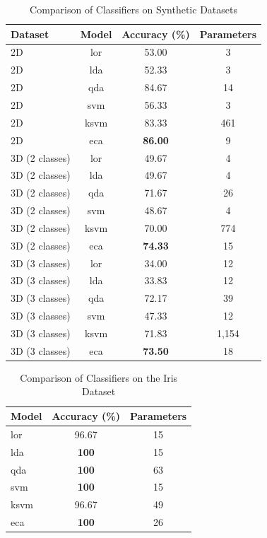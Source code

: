 \documentclass[lettersize,journal]{IEEEtran}
\begin{document}
\begin{table}[ht]
    \caption{Comparison of Classifiers on Synthetic Datasets}
    \centering
    \begin{tabular}{@{}lccc@{}}
        \toprule
        \textbf{Dataset} & \textbf{Model} & \textbf{Accuracy (\%)} & \textbf{Parameters} \\ \midrule
        2D & \Gls{lor} & 53.00 & 3 \\
        2D & \Gls{lda} & 52.33 & 3 \\
        2D & \Gls{qda} & 84.67 & 14 \\
        2D & \Gls{svm} & 56.33 & 3 \\
        2D & \Gls{ksvm} & 83.33 & 461 \\
        2D & \Gls{eca} & \textbf{86.00} & 9 \\ \midrule
        3D (2 classes) & \Gls{lor} & 49.67 & 4 \\
        3D (2 classes) & \Gls{lda} & 49.67 & 4 \\
        3D (2 classes) & \Gls{qda} & 71.67 & 26 \\
        3D (2 classes) & \Gls{svm} & 48.67 & 4 \\
        3D (2 classes) & \Gls{ksvm} & 70.00 & 774 \\
        3D (2 classes) & \Gls{eca} & \textbf{74.33} & 15 \\ \midrule
        3D (3 classes) & \Gls{lor} & 34.00 & 12 \\
        3D (3 classes) & \Gls{lda} & 33.83 & 12 \\
        3D (3 classes) & \Gls{qda} & 72.17 & 39 \\
        3D (3 classes) & \Gls{svm} & 47.33 & 12 \\
        3D (3 classes) & \Gls{ksvm} & 71.83 & 1,154 \\
        3D (3 classes) & \Gls{eca} & \textbf{73.50} & 18 \\ \bottomrule
    \end{tabular}
    \label{tab:synthetic}
\end{table}

\begin{table}[ht]
    \caption{Comparison of Classifiers on the Iris Dataset}
    \centering
    \begin{tabular}{@{}lcc@{}}
        \toprule
        \textbf{Model} & \textbf{Accuracy (\%)} & \textbf{Parameters} \\ \midrule
        \Gls{lor} & 96.67 & 15 \\
        \Gls{lda} & \textbf{100} & 15 \\
        \Gls{qda} & \textbf{100} & 63 \\
        \Gls{svm} & \textbf{100} & 15 \\
        \Gls{ksvm} & 96.67 & 49 \\
        \Gls{eca} & \textbf{100} & 26 \\ \bottomrule
    \end{tabular}
    \label{tab:iris}
\end{table}
\end{document}
